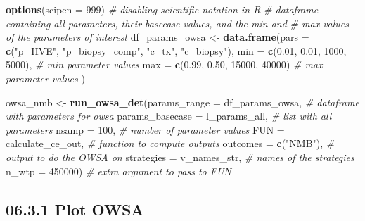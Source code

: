 \documentclass[
]{article}
\newenvironment{Shaded}{\begin{snugshade}}{\end{snugshade}}
\newcommand{\CommentTok}[1]{\textcolor[rgb]{0.56,0.35,0.01}{\textit{#1}}}
\newcommand{\DataTypeTok}[1]{\textcolor[rgb]{0.13,0.29,0.53}{#1}}
\newcommand{\DecValTok}[1]{\textcolor[rgb]{0.00,0.00,0.81}{#1}}
\newcommand{\FloatTok}[1]{\textcolor[rgb]{0.00,0.00,0.81}{#1}}
\newcommand{\KeywordTok}[1]{\textcolor[rgb]{0.13,0.29,0.53}{\textbf{#1}}}
\newcommand{\NormalTok}[1]{#1}
\newcommand{\StringTok}[1]{\textcolor[rgb]{0.31,0.60,0.02}{#1}}
\begin{document}
\begin{Shaded}
\begin{Highlighting}[]
\KeywordTok{options}\NormalTok{(}\DataTypeTok{scipen =} \DecValTok{999}\NormalTok{) }\CommentTok{# disabling scientific notation in R}
\CommentTok{# dataframe containing all parameters, their basecase values, and the min and }
\CommentTok{# max values of the parameters of interest }
\NormalTok{df_params_owsa <-}\StringTok{ }\KeywordTok{data.frame}\NormalTok{(}\DataTypeTok{pars =} \KeywordTok{c}\NormalTok{(}\StringTok{"p_HVE"}\NormalTok{, }\StringTok{"p_biopsy_comp"}\NormalTok{, }\StringTok{"c_tx"}\NormalTok{, }\StringTok{"c_biopsy"}\NormalTok{),}
                             \DataTypeTok{min  =} \KeywordTok{c}\NormalTok{(}\FloatTok{0.01}\NormalTok{, }\FloatTok{0.01}\NormalTok{,  }\DecValTok{1000}\NormalTok{, }\DecValTok{5000}\NormalTok{),  }\CommentTok{# min parameter values}
                             \DataTypeTok{max  =} \KeywordTok{c}\NormalTok{(}\FloatTok{0.99}\NormalTok{, }\FloatTok{0.50}\NormalTok{, }\DecValTok{15000}\NormalTok{, }\DecValTok{40000}\NormalTok{)  }\CommentTok{# max parameter values}
\NormalTok{                             )}

\NormalTok{owsa_nmb <-}\StringTok{ }\KeywordTok{run_owsa_det}\NormalTok{(}\DataTypeTok{params_range =}\NormalTok{ df_params_owsa,  }\CommentTok{# dataframe with parameters for owsa}
                         \DataTypeTok{params_basecase =}\NormalTok{ l_params_all, }\CommentTok{# list with all parameters}
                         \DataTypeTok{nsamp      =} \DecValTok{100}\NormalTok{,               }\CommentTok{# number of parameter values}
                         \DataTypeTok{FUN        =}\NormalTok{ calculate_ce_out,  }\CommentTok{# function to compute outputs}
                         \DataTypeTok{outcomes   =} \KeywordTok{c}\NormalTok{(}\StringTok{"NMB"}\NormalTok{),          }\CommentTok{# output to do the OWSA on}
                         \DataTypeTok{strategies =}\NormalTok{ v_names_str,       }\CommentTok{# names of the strategies}
                         \DataTypeTok{n_wtp      =} \DecValTok{450000}\NormalTok{)            }\CommentTok{# extra argument to pass to FUN}
\end{Highlighting}
\end{Shaded}

\hypertarget{plot-owsa}{%
\subsection{06.3.1 Plot OWSA}\label{plot-owsa}}
\end{document}
